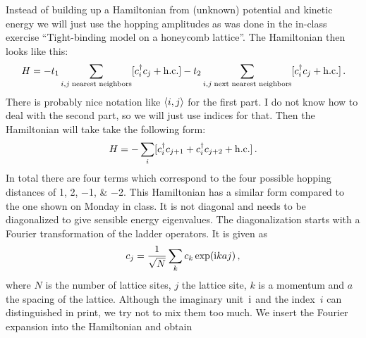 \documentclass[11pt, english, fleqn, DIV=15, headinclude, BCOR=1cm]{scrartcl}
\begin{document}
Instead of building up a Hamiltonian from (unknown) potential and kinetic
energy we will just use the hopping amplitudes as was done in the in-class
exercise “Tight-binding model on a honeycomb lattice”. The Hamiltonian then
looks like this:
\[
    H =
    - t_1 \sum_{i, j \; \text{nearest neighbors}}
    [c_i^\dagger c_j + \mathrm{h.c.}]
    - t_2 \sum_{i, j \; \text{next nearest neighbors}}
    [c_i^\dagger c_j + \mathrm{h.c.}] \,.
\]
There is probably nice notation like $\braket{i, j}$ for the first part. I do
not know how to deal with the second part, so we will just use indices for
that. Then the Hamiltonian will take take the following form:
\[
    H =
    - \sum_i
    [c_i^\dagger c_{j+1} + c_i^\dagger c_{j+2} + \mathrm{h.c.}] \,.
\]
In total there are four terms which correspond to the four possible hopping
distances of \numlist{+1;+2;-1;-2}. This Hamiltonian has a similar form
compared to the one shown on Monday in class. It is not diagonal and needs to
be diagonalized to give sensible energy eigenvalues. The diagonalization starts
with a Fourier transformation of the ladder operators. It is given as
\[
    c_j = \frac{1}{\sqrt{N}} \sum_k c_k \exp(\mathrm i kaj) \,,
\]
where $N$ is the number of lattice sites, $j$ the lattice site, $k$ is a
momentum and $a$ the spacing of the lattice. Although the imaginary unit~$\mathrm i$
and the index~$i$ can distinguished in print, we try not to mix them too much.
We insert the Fourier expansion into the Hamiltonian and obtain
\end{document}
